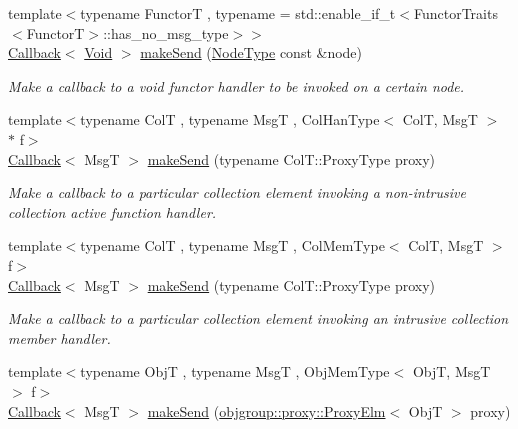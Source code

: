 \begin{DoxyCompactItemize}
{\footnotesize template$<$typename FunctorT , typename  = std\+::enable\+\_\+if\+\_\+t$<$\+Functor\+Traits$<$\+Functor\+T$>$\+::has\+\_\+no\+\_\+msg\+\_\+type$>$$>$ }\\\hyperlink{namespacevt_a36db99df4c973d48b1118a293fff533f}{Callback}$<$ \hyperlink{structvt_1_1pipe_1_1_pipe_manager_ab720c2580ecfd3ab36e49aeaaff64cc6}{Void} $>$ \hyperlink{structvt_1_1pipe_1_1_pipe_manager_a89f95b27b13c69f2fe84dc29fd604082}{make\+Send} (\hyperlink{namespacevt_a866da9d0efc19c0a1ce79e9e492f47e2}{Node\+Type} const \&node)
\begin{DoxyCompactList}\small\item\em Make a callback to a void functor handler to be invoked on a certain node. \end{DoxyCompactList}\item 
{\footnotesize template$<$typename ColT , typename MsgT , Col\+Han\+Type$<$ Col\+T, Msg\+T $>$ $\ast$ f$>$ }\\\hyperlink{namespacevt_a36db99df4c973d48b1118a293fff533f}{Callback}$<$ MsgT $>$ \hyperlink{structvt_1_1pipe_1_1_pipe_manager_a612b59953b949edc575577e313e3b187}{make\+Send} (typename Col\+T\+::\+Proxy\+Type proxy)
\begin{DoxyCompactList}\small\item\em Make a callback to a particular collection element invoking a non-\/intrusive collection active function handler. \end{DoxyCompactList}\item 
{\footnotesize template$<$typename ColT , typename MsgT , Col\+Mem\+Type$<$ Col\+T, Msg\+T $>$ f$>$ }\\\hyperlink{namespacevt_a36db99df4c973d48b1118a293fff533f}{Callback}$<$ MsgT $>$ \hyperlink{structvt_1_1pipe_1_1_pipe_manager_a87e25e6a0151c0a9a48b58e6f4679b02}{make\+Send} (typename Col\+T\+::\+Proxy\+Type proxy)
\begin{DoxyCompactList}\small\item\em Make a callback to a particular collection element invoking an intrusive collection member handler. \end{DoxyCompactList}\item 
{\footnotesize template$<$typename ObjT , typename MsgT , Obj\+Mem\+Type$<$ Obj\+T, Msg\+T $>$ f$>$ }\\\hyperlink{namespacevt_a36db99df4c973d48b1118a293fff533f}{Callback}$<$ MsgT $>$ \hyperlink{structvt_1_1pipe_1_1_pipe_manager_aa5d48a3b64820bec240a6a61bdfb4524}{make\+Send} (\hyperlink{structvt_1_1objgroup_1_1proxy_1_1_proxy_elm}{objgroup\+::proxy\+::\+Proxy\+Elm}$<$ ObjT $>$ proxy)

\end{DoxyCompactItemize}
